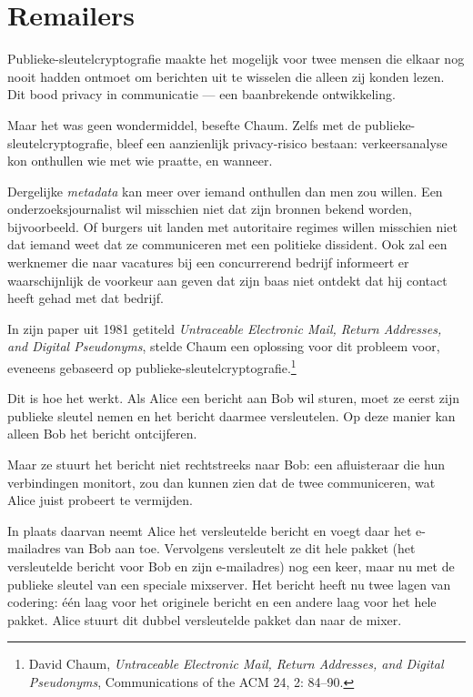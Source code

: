 \documentclass[
  a5paper,
  smalldemyvopaper,11pt,twoside,onecolumn,openright,extrafontsizes,
hidelinks]{memoir}
\begin{document}
\section{Remailers}\label{remailers}

Publieke-sleutelcryptografie maakte het mogelijk voor twee mensen die
elkaar nog nooit hadden ontmoet om berichten uit te wisselen die alleen
zij konden lezen. Dit bood privacy in communicatie --- een baanbrekende
ontwikkeling.

Maar het was geen wondermiddel, besefte Chaum. Zelfs met de
publieke-sleutelcryptografie, bleef een aanzienlijk privacy-risico
bestaan: verkeersanalyse kon onthullen wie met wie praatte, en wanneer.

Dergelijke \emph{metadata} kan meer over iemand onthullen dan men zou
willen. Een onderzoeksjournalist wil misschien niet dat zijn bronnen
bekend worden, bijvoorbeeld. Of burgers uit landen met autoritaire
regimes willen misschien niet dat iemand weet dat ze communiceren met
een politieke dissident. Ook zal een werknemer die naar vacatures bij
een concurrerend bedrijf informeert er waarschijnlijk de voorkeur aan
geven dat zijn baas niet ontdekt dat hij contact heeft gehad met dat
bedrijf.

In zijn paper uit 1981 getiteld \emph{Untraceable Electronic Mail,
Return Addresses, and Digital Pseudonyms}, stelde Chaum een oplossing
voor dit probleem voor, eveneens gebaseerd op
publieke-sleutelcryptografie.\footnote{David Chaum, \emph{Untraceable
  Electronic Mail, Return Addresses, and Digital Pseudonyms},
  Communications of the ACM 24, 2: 84--90.}

Dit is hoe het werkt. Als Alice een bericht aan Bob wil sturen, moet ze eerst zijn publieke
sleutel nemen en het bericht daarmee versleutelen. Op deze manier kan
alleen Bob het bericht ontcijferen.

Maar ze stuurt het bericht niet rechtstreeks naar Bob: een afluisteraar
die hun verbindingen monitort, zou dan kunnen zien dat de twee
communiceren, wat Alice juist probeert te vermijden.

In plaats daarvan neemt Alice het versleutelde bericht en voegt daar het
e-mailadres van Bob aan toe. Vervolgens versleutelt ze dit hele pakket
(het versleutelde bericht voor Bob en zijn e-mailadres) nog een keer,
maar nu met de publieke sleutel van een speciale mixserver. Het bericht
heeft nu twee lagen van codering: één laag voor het originele bericht en
een andere laag voor het hele pakket. Alice stuurt dit dubbel
versleutelde pakket dan naar de mixer.
\end{document}
